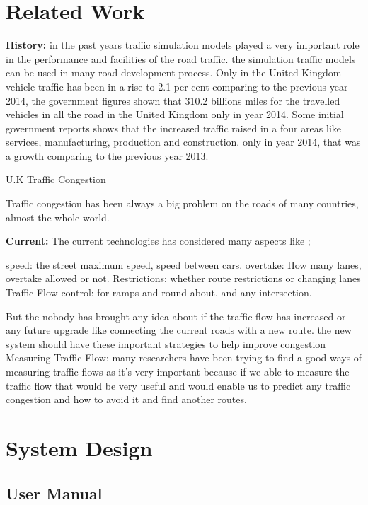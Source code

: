 \documentclass[11pt]{article}
\begin{document}
\section{Related Work} %
	
	\textbf{History:} 
in the past years traffic simulation models played a very important role in the performance and facilities of the road traffic. the simulation traffic models can be used in many road development process.
Only in the United Kingdom vehicle traffic has been in a rise to 2.1 per cent comparing to the previous year 2014, the government figures shown that 310.2 billions miles for the travelled vehicles in all the road in the United Kingdom only in year 2014.  
Some initial government reports shows that the increased traffic raised in a four areas like services, manufacturing, production and construction. only in year 2014, that was a growth comparing to the previous year 2013.

U.K Traffic Congestion 

Traffic congestion has been always a big problem on the roads of many countries, almost the whole world. 


	\textbf{Current:} 
The current technologies has considered many aspects like ;

speed: the street maximum speed, speed between cars. 
overtake: How many lanes, overtake allowed or not.
Restrictions: whether route restrictions or changing lanes 
Traffic Flow control: for ramps and round about, and any intersection.

But the nobody has brought any idea about if the traffic flow has increased or any future upgrade like connecting the current roads with a new route. the new system should have these important strategies to help improve congestion 
Measuring Traffic Flow: many researchers have been trying to find a good ways of measuring traffic flows as it’s very important because if we able to measure the traffic flow that would be very useful and would enable us to predict any traffic congestion and how to avoid it and find another routes. 
	\section{System Design} %
	\subsection{User Manual}%
\end{document}
